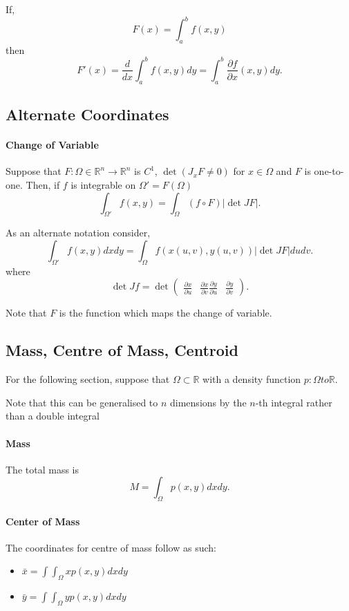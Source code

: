 If,
\[F(x) = \int_a^b f(x, y)\]
then
\[F'(x) = \frac{d}{dx} \int_a^b f(x, y)dy = \int_a^b \frac{\partial f}{\partial x}(x,y) dy.\]

\subsection{Alternate Coordinates}
\paragraph{Change of Variable}
Suppose that \(F: \Omega\in\mathbb{R}^n \to \mathbb{R}^n\) is \(C^1\),
\(\det(J_xF \neq 0)\) for \(x\in\Omega\) and \(F\) is one-to-one.
Then, if \(f\) is integrable on \(\Omega ' = F(\Omega)\)
\[
    \int_{\Omega '} f(x, y)
    =
    \int_{\Omega} (f\circ F) |\det J F|.
\]

As an alternate notation consider,
\[
    \int_{\Omega '} f(x, y)dx dy
    =
    \int_\Omega f( x(u, v), y(u, v) ) |\det JF| du dv.
\]
where
\[
    \det Jf = \det \begin{pmatrix}
        \frac{\partial x}{\partial u} & \frac{\partial x}{\partial v}
        \frac{\partial y}{\partial u} & \frac{\partial y}{\partial v}
    \end{pmatrix}.
\]

Note that \(F\) is the function which maps the change of variable.

\subsection{Mass, Centre of Mass, Centroid}
For the following section, suppose that \(\Omega\subset \mathbb{R}\)
with a density function \(p: \Omega to \mathbb{R}\).

Note that this can be generalised to \(n\) dimensions by the \(n\)-th integral
rather than a double integral

\paragraph{Mass}
The total mass is
\[M = \int_\Omega p(x, y) dx dy.\]

\paragraph{Center of Mass}
The coordinates for centre of mass follow as such:
\begin{itemize}
    \item \(\bar{x} = \int\int_\Omega x p(x, y) dx dy\)
    \item \(\bar{y} = \int\int_\Omega y p(x, y) dx dy\)
\end{itemize}



